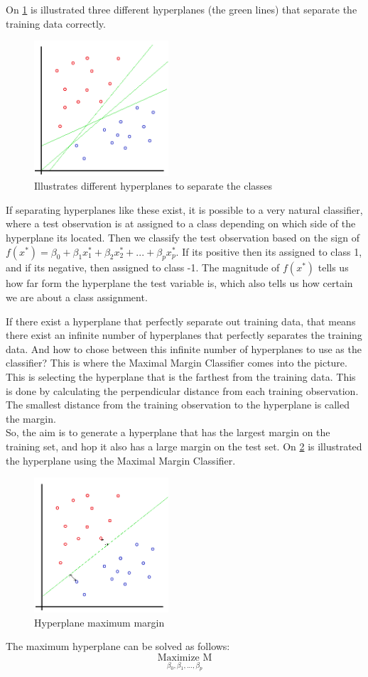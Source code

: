 On \cref{fig:Hyperplanes} is illustrated three different hyperplanes (the green lines) that separate the training data correctly. 
\begin{figure}[H]
	\centering
	\includegraphics[width=5cm]{Img/Hyperplanes.PNG}
	\caption{Illustrates different hyperplanes to separate the classes}
	\label{fig:Hyperplanes}
\end{figure} 

If separating hyperplanes like these exist, it is possible to a very natural classifier, where a test observation is at assigned to a class depending on which side of the hyperplane its located. Then we classify the test observation based on the sign of $f(x^*) = \beta_0 + \beta_1 x_1^* + \beta_2 x_2^* + ... + \beta_p x_p^*$. If its positive then its assigned to class 1, and if its negative, then assigned to class -1. The magnitude of $f(x^*)$ tells us how far form the hyperplane the test variable is, which also tells us how certain we are about a class assignment. 

If there exist a hyperplane that perfectly separate out training data, that means there exist an infinite number of hyperplanes that perfectly separates the training data. And how to chose between this infinite number of hyperplanes to use as the classifier? This is where the Maximal Margin Classifier comes into the picture. This is selecting the hyperplane that is the farthest from the training data. This is done by calculating the perpendicular distance from each training observation.  The smallest distance from the training observation to the hyperplane is called the margin. \\
So, the aim is to generate a hyperplane that has the largest margin on the training set, and hop it also has a large margin on the test set. On \cref{fig:Hyperplane_margin} is illustrated the hyperplane using the Maximal Margin Classifier.

\begin{figure}[H]
	\centering
	\includegraphics[width=5cm]{Img/Hyperplane_margin.PNG}
	\caption{Hyperplane maximum margin}
	\label{fig:Hyperplane_margin}
\end{figure} 
The maximum hyperplane can be solved as follows\cite{book_2015}: 
$$\underset{\beta_0 ,\beta_1 ,...,\beta_p}{\text{Maximize M}}$$

